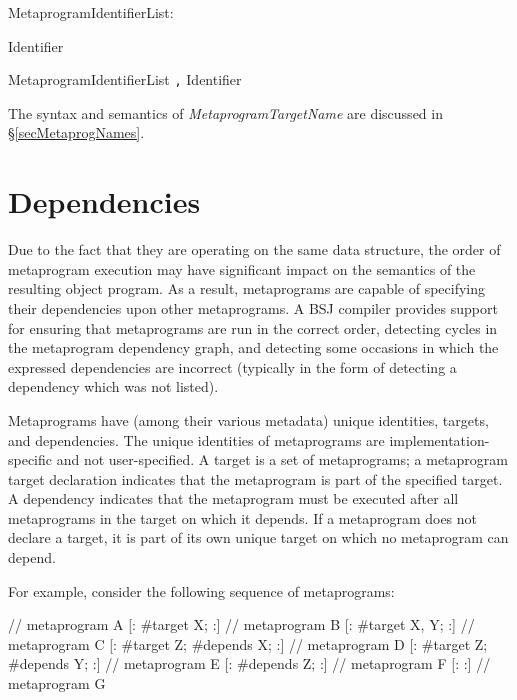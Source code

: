\documentclass[a4paper,10pt]{report}
\newenvironment{code}{\small\verbatim}{\endverbatim}
\newcommand{\refS}[1]{\hyperref[#1]{\S\ref{#1}}}
\newenvironment{grammar}{
    \begin{list}{}{
        \itshape
        \setlength{\partopsep}{\topsep}
        \setlength{\topsep}{0cm}
    }
}{
    \end{list}
}
\begin{document}
\begin{grammar}
    \item MetaprogramIdentifierList:
    \begin{grammar}
        \item Identifier
        \item MetaprogramIdentifierList \verb`,` Identifier
    \end{grammar}
\end{grammar}

The syntax and semantics of \textit{MetaprogramTargetName} are discussed in \refS{secMetaprogNames}.

\section{Dependencies}
\label{secMetaprogDeps}

Due to the fact that they are operating on the same data structure, the order of metaprogram execution may have significant impact on the semantics of the resulting object program.  As a result, metaprograms are capable of specifying their dependencies upon other metaprograms.  A BSJ compiler provides support for ensuring that metaprograms are run in the correct order, detecting cycles in the metaprogram dependency graph, and detecting some occasions in which the expressed dependencies are incorrect (typically in the form of detecting a dependency which was not listed).

Metaprograms have (among their various metadata) unique identities, targets, and dependencies.  The unique identities of metaprograms are implementation-specific and not user-specified.  A target is a set of metaprograms; a metaprogram target declaration indicates that the metaprogram is part of the specified target.  A dependency indicates that the metaprogram must be executed after all metaprograms in the target on which it depends.  If a metaprogram does not declare a target, it is part of its own unique target on which no metaprogram can depend.

For example, consider the following sequence of metaprograms:

\begin{code}
    [: #target X; :]              // metaprogram A
    [: #target X; :]              // metaprogram B
    [: #target X, Y; :]           // metaprogram C
    [: #target Z; #depends X; :]  // metaprogram D
    [: #target Z; #depends Y; :]  // metaprogram E
    [: #depends Z; :]             // metaprogram F
    [: :]                         // metaprogram G
\end{code}
\end{document}
